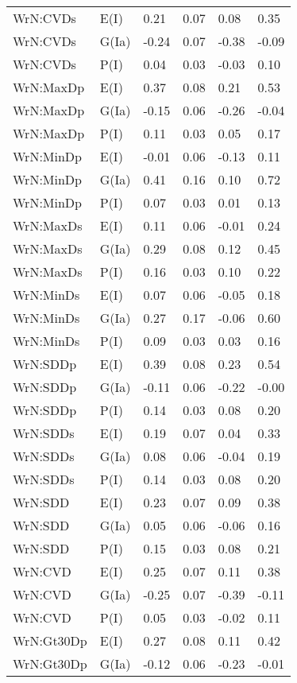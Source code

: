 \begin{center}
\begin{longtable}{|p{1.1in}|p{0.7in}|p{0.7in}|p{0.6in}|p{0.6in}|p{0.6in}|}
  WrN:CVDs & E(I) & 0.21 & 0.07 & 0.08 & 0.35 \\ 
  WrN:CVDs & G(Ia) & -0.24 & 0.07 & -0.38 & -0.09 \\ 
  WrN:CVDs & P(I) & 0.04 & 0.03 & -0.03 & 0.10 \\ 
  WrN:MaxDp & E(I) & 0.37 & 0.08 & 0.21 & 0.53 \\ 
  WrN:MaxDp & G(Ia) & -0.15 & 0.06 & -0.26 & -0.04 \\ 
  WrN:MaxDp & P(I) & 0.11 & 0.03 & 0.05 & 0.17 \\ 
  WrN:MinDp & E(I) & -0.01 & 0.06 & -0.13 & 0.11 \\ 
  WrN:MinDp & G(Ia) & 0.41 & 0.16 & 0.10 & 0.72 \\ 
  WrN:MinDp & P(I) & 0.07 & 0.03 & 0.01 & 0.13 \\ 
  WrN:MaxDs & E(I) & 0.11 & 0.06 & -0.01 & 0.24 \\ 
  WrN:MaxDs & G(Ia) & 0.29 & 0.08 & 0.12 & 0.45 \\ 
  WrN:MaxDs & P(I) & 0.16 & 0.03 & 0.10 & 0.22 \\ 
  WrN:MinDs & E(I) & 0.07 & 0.06 & -0.05 & 0.18 \\ 
  WrN:MinDs & G(Ia) & 0.27 & 0.17 & -0.06 & 0.60 \\ 
  WrN:MinDs & P(I) & 0.09 & 0.03 & 0.03 & 0.16 \\ 
  WrN:SDDp & E(I) & 0.39 & 0.08 & 0.23 & 0.54 \\ 
  WrN:SDDp & G(Ia) & -0.11 & 0.06 & -0.22 & -0.00 \\ 
  WrN:SDDp & P(I) & 0.14 & 0.03 & 0.08 & 0.20 \\ 
  WrN:SDDs & E(I) & 0.19 & 0.07 & 0.04 & 0.33 \\ 
  WrN:SDDs & G(Ia) & 0.08 & 0.06 & -0.04 & 0.19 \\ 
  WrN:SDDs & P(I) & 0.14 & 0.03 & 0.08 & 0.20 \\ 
  WrN:SDD & E(I) & 0.23 & 0.07 & 0.09 & 0.38 \\ 
  WrN:SDD & G(Ia) & 0.05 & 0.06 & -0.06 & 0.16 \\ 
  WrN:SDD & P(I) & 0.15 & 0.03 & 0.08 & 0.21 \\ 
  WrN:CVD & E(I) & 0.25 & 0.07 & 0.11 & 0.38 \\ 
  WrN:CVD & G(Ia) & -0.25 & 0.07 & -0.39 & -0.11 \\ 
  WrN:CVD & P(I) & 0.05 & 0.03 & -0.02 & 0.11 \\ 
  WrN:Gt30Dp & E(I) & 0.27 & 0.08 & 0.11 & 0.42 \\ 
  WrN:Gt30Dp & G(Ia) & -0.12 & 0.06 & -0.23 & -0.01 \\ 

\end{longtable}
\end{center}
